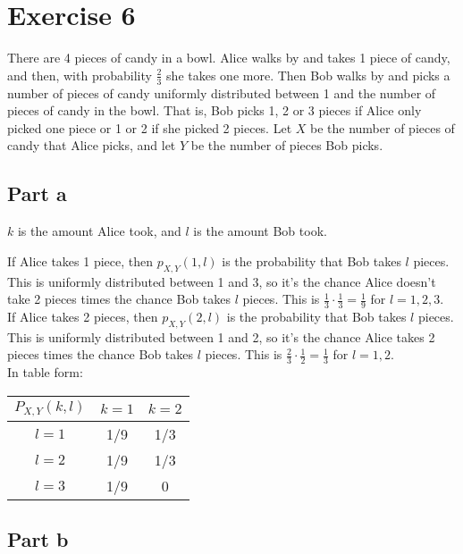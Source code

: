 \section{Exercise 6}
There are 4 pieces of candy in a bowl. Alice walks by and takes 1 piece of candy, and then, with probability $\frac{2}{3}$ she takes one more. Then Bob walks by and picks a number of pieces of candy uniformly distributed between 1 and the number of pieces of candy in the bowl. That is, Bob picks 1, 2 or 3 pieces if Alice only picked one piece or 1 or 2 if she picked 2 pieces. Let $X$ be the number of pieces of candy that Alice picks, and let $Y$ be the number of pieces Bob picks.

\subsection{Part a}

$k$ is the amount Alice took, and $l$ is the amount Bob took.

If Alice takes 1 piece, then $p_{X,Y}(1, l)$ is the probability that Bob takes $l$ pieces. This is uniformly distributed between 1 and 3, so it's the chance Alice doesn't take 2 pieces times the chance Bob takes $l$ pieces. This is $\frac{1}{3} \cdot \frac{1}{3} = \frac{1}{9}$ for $l = 1, 2, 3$.\\

If Alice takes 2 pieces, then $p_{X,Y}(2, l)$ is the probability that Bob takes $l$ pieces. This is uniformly distributed between 1 and 2, so it's the chance Alice takes 2 pieces times the chance Bob takes $l$ pieces. This is $\frac{2}{3} \cdot \frac{1}{2} = \frac{1}{3}$ for $l = 1, 2$.\\

In table form:

\begin{center}
	\begin{tabular}{c|cc}
		$P_{X,Y}(k,l)$ & $k = 1$ & $k = 2$ \\ \hline
		$l = 1$        & 1/9     & 1/3     \\
		$l = 2$        & 1/9     & 1/3     \\
		$l = 3$        & 1/9     & 0       \\
	\end{tabular}
\end{center}

\subsection{Part b}

